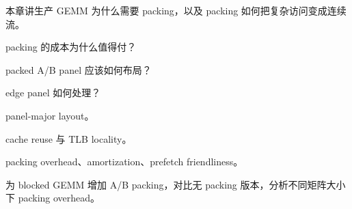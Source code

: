 {本章讲生产 GEMM 为什么需要 packing，以及 packing 如何把复杂访问变成连续流。}
{\item packing 的成本为什么值得付？
\item packed A/B panel 应该如何布局？
\item edge panel 如何处理？}
{\item panel-major layout。
\item cache reuse 与 TLB locality。
\item packing overhead、amortization、prefetch friendliness。}
{为 blocked GEMM 增加 A/B packing，对比无 packing 版本，分析不同矩阵大小下 packing overhead。}
